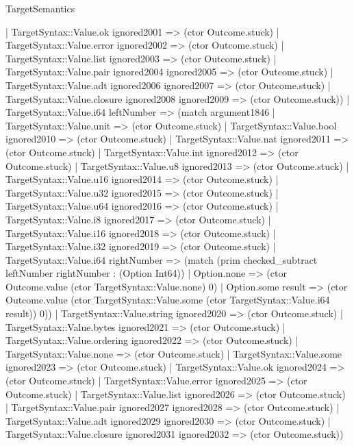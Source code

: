 \begin{lexlean}{TargetSemantics}
\begin{semanticmodule}
{              | TargetSyntax::Value.ok ignored2001 => (ctor Outcome.stuck)
              | TargetSyntax::Value.error ignored2002 => (ctor Outcome.stuck)
              | TargetSyntax::Value.list ignored2003 => (ctor Outcome.stuck)
              | TargetSyntax::Value.pair ignored2004 ignored2005 => (ctor Outcome.stuck)
              | TargetSyntax::Value.adt ignored2006 ignored2007 => (ctor Outcome.stuck)
              | TargetSyntax::Value.closure ignored2008 ignored2009 => (ctor Outcome.stuck))
            | TargetSyntax::Value.i64 leftNumber => (match argument1846
              | TargetSyntax::Value.unit => (ctor Outcome.stuck)
              | TargetSyntax::Value.bool ignored2010 => (ctor Outcome.stuck)
              | TargetSyntax::Value.nat ignored2011 => (ctor Outcome.stuck)
              | TargetSyntax::Value.int ignored2012 => (ctor Outcome.stuck)
              | TargetSyntax::Value.u8 ignored2013 => (ctor Outcome.stuck)
              | TargetSyntax::Value.u16 ignored2014 => (ctor Outcome.stuck)
              | TargetSyntax::Value.u32 ignored2015 => (ctor Outcome.stuck)
              | TargetSyntax::Value.u64 ignored2016 => (ctor Outcome.stuck)
              | TargetSyntax::Value.i8 ignored2017 => (ctor Outcome.stuck)
              | TargetSyntax::Value.i16 ignored2018 => (ctor Outcome.stuck)
              | TargetSyntax::Value.i32 ignored2019 => (ctor Outcome.stuck)
              | TargetSyntax::Value.i64 rightNumber => (match (prim checked_subtract leftNumber rightNumber : (Option Int64))
                | Option.none => (ctor Outcome.value (ctor TargetSyntax::Value.none) 0)
                | Option.some result => (ctor Outcome.value (ctor TargetSyntax::Value.some (ctor TargetSyntax::Value.i64 result)) 0))
              | TargetSyntax::Value.string ignored2020 => (ctor Outcome.stuck)
              | TargetSyntax::Value.bytes ignored2021 => (ctor Outcome.stuck)
              | TargetSyntax::Value.ordering ignored2022 => (ctor Outcome.stuck)
              | TargetSyntax::Value.none => (ctor Outcome.stuck)
              | TargetSyntax::Value.some ignored2023 => (ctor Outcome.stuck)
              | TargetSyntax::Value.ok ignored2024 => (ctor Outcome.stuck)
              | TargetSyntax::Value.error ignored2025 => (ctor Outcome.stuck)
              | TargetSyntax::Value.list ignored2026 => (ctor Outcome.stuck)
              | TargetSyntax::Value.pair ignored2027 ignored2028 => (ctor Outcome.stuck)
              | TargetSyntax::Value.adt ignored2029 ignored2030 => (ctor Outcome.stuck)
              | TargetSyntax::Value.closure ignored2031 ignored2032 => (ctor Outcome.stuck))
}
\end{semanticmodule}
\end{lexlean}
